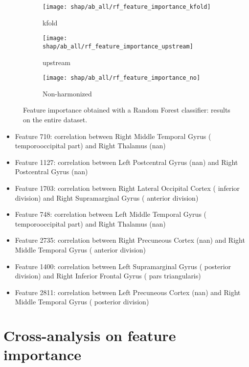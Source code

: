 \documentclass[10pt]{report}
\begin{document}
\begin{figure}
\centering
\begin{subfigure}[b]{.45\textwidth}
   \texttt{[image: shap/ab\_all/rf\_feature\_importance\_kfold]}
   \caption{kfold}
   \label{}
\end{subfigure}
\begin{subfigure}[b]{.45\textwidth}
   \texttt{[image: shap/ab\_all/rf\_feature\_importance\_upstream]}
   \caption{upstream}
   \label{}
\end{subfigure}
\begin{subfigure}[b]{.45\textwidth}
   \texttt{[image: shap/ab\_all/rf\_feature\_importance\_no]}
   \caption{Non-harmonized}
   \label{}
\end{subfigure}
\caption{Feature importance obtained with a Random Forest classifier: results on the entire dataset.}
\label{fig:shap_abide_rf_all}
\end{figure}



\begin{itemize}
\item Feature 710: correlation between Right Middle Temporal Gyrus ( temporooccipital part) and Right Thalamus (nan)
\item Feature 1127: correlation between Left Postcentral Gyrus (nan) and Right Postcentral Gyrus (nan)
\item Feature 1703: correlation between Right Lateral Occipital Cortex ( inferior division) and Right Supramarginal Gyrus ( anterior division)
\item Feature 748: correlation between Left Middle Temporal Gyrus ( temporooccipital part) and Right Thalamus (nan)
\item Feature 2735: correlation between Right Precuneous Cortex (nan) and Right Middle Temporal Gyrus ( anterior division)
\item Feature 1400: correlation between Left Supramarginal Gyrus ( posterior division) and Right Inferior Frontal Gyrus ( pars triangularis)
\item Feature 2811: correlation between Left Precuneous Cortex (nan) and Right Middle Temporal Gyrus ( posterior division)
\end{itemize}

\newpage
\section{Cross-analysis on feature importance}\label{sec:feature_importance_5}
\end{document}
